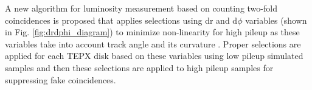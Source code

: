 A new algorithm for luminosity measurement based on counting two-fold coincidences is proposed that applies selections using dr and d$\phi$ variables (shown in Fig. \ref{fig:drdphi_diagram}) to minimize non-linearity for high pileup as these variables take into account track angle and its curvature \cite{sehrawat2020}.  Proper selections are applied for each TEPX disk based on these variables using low pileup simulated samples and then these selections are applied to high pileup samples for suppressing fake coincidences.


